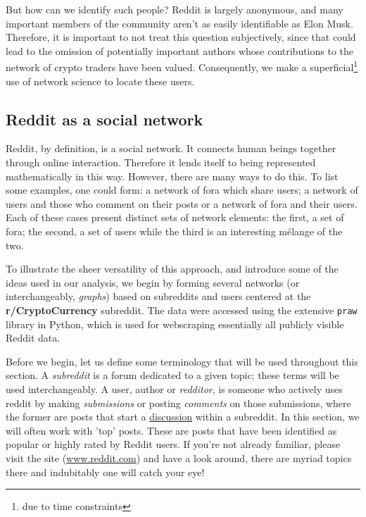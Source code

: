 \documentclass[twoside]{report}
\newcommand{\code}{\texttt}
\begin{document}
\begin{spacing}{1}
But how can we identify such people? Reddit is largely anonymous, and many important members of the community aren't as easily identifiable as Elon Musk. Therefore, it is important to not treat this question subjectively, since that could lead to the omission of potentially important authors whose contributions to the network of crypto traders have been valued. Consequently, we make a superficial\footnote{due to time constraints} use of network science to locate these users. 

\subsection{Reddit as a social network}\label{sec:redditSN}

Reddit, by definition, is a social network. It connects human beings together through online interaction. Therefore it lends itself to being represented mathematically in this way. However, there are many ways to do this. To list some examples, one could form: a network of fora which share users; a network of users and those who comment on their posts or a network of fora and their users. Each of these cases present distinct sets of network elements: the first, a set of fora; the second, a set of users while the third is an interesting mélange of the two. 

To illustrate the sheer versatility of this approach, and introduce some of the ideas used in our analysis, we begin by forming several networks (or interchangeably, \textit{graphs}) based on subreddits and users centered at the \textbf{r/CryptoCurrency} subreddit. The data were accessed using the extensive \code{praw} library in Python, which is used for webscraping essentially all publicly visible Reddit data. 

Before we begin, let us define some terminology that will be used throughout this section. A \textit{subreddit} is a forum dedicated to a given topic; these terms will be used interchangeably. A user, author or \textit{redditor}, is someone who actively uses reddit by making \textit{submissions} or posting \textit{comments} on those submissions, where the former are posts that start a \underline{discussion} within a subreddit. In this section, we will often work with 'top' posts. These are posts that have been identified as popular or highly rated by Reddit users. If you're not already familiar, please visit the site (\url{www.reddit.com}) and have a look around, there are myriad topics there and indubitably one will catch your eye!\\ 


\end{spacing}
\end{document}
